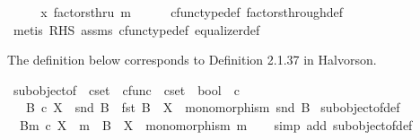 \begin{isabellebody}
\ \ \isamarkupfalse%
\ \isamarkupfalse%
\ {\isachardoublequoteopen}x\ factorsthru\ m{\isachardoublequoteclose}\isanewline
\ \ \ \ \isamarkupfalse%
\ cfunc{\isacharunderscore}{\kern0pt}type{\isacharunderscore}{\kern0pt}def\ factors{\isacharunderscore}{\kern0pt}through{\isacharunderscore}{\kern0pt}def\isanewline
\ \ \ \ \isamarkupfalse%
\ {\isacharparenleft}{\kern0pt}metis\ RHS\ assms{\isacharparenleft}{\kern0pt}{}{\isacharcomma}{\kern0pt}{}{\isacharcomma}{\kern0pt}{}{\isacharparenright}{\kern0pt}\ cfunc{\isacharunderscore}{\kern0pt}type{\isacharunderscore}{\kern0pt}def\ equalizer{\isacharunderscore}{\kern0pt}def{\isacharparenright}{\kern0pt}\isanewline
{}\isamarkupfalse%
%
\endisatagproof
{\isafoldproof}%
%
\isadelimproof
%
\endisadelimproof
%
\begin{isamarkuptext}%
The definition below corresponds to Definition 2.1.37 in Halvorson.%
\end{isamarkuptext}\isamarkuptrue%
\isamarkupfalse%
\ subobject{\isacharunderscore}{\kern0pt}of\ {\isacharcolon}{\kern0pt}{\isacharcolon}{\kern0pt}\ {\isachardoublequoteopen}cset\ {\isasymtimes}\ cfunc\ {\isasymRightarrow}\ cset\ {\isasymRightarrow}\ bool{\isachardoublequoteclose}\ {\isacharparenleft}{\kern0pt}\ {\isachardoublequoteopen}{\isasymsubseteq}\isactrlsub c{\isachardoublequoteclose}\ {}{}{\isacharparenright}{\kern0pt}\isanewline
\ \ \ {\isachardoublequoteopen}B\ {\isasymsubseteq}\isactrlsub c\ X\ {\isasymlongleftrightarrow}\ {\isacharparenleft}{\kern0pt}snd\ B\ {\isacharcolon}{\kern0pt}\ fst\ B\ {\isasymrightarrow}\ X\ {\isasymand}\ monomorphism\ {\isacharparenleft}{\kern0pt}snd\ B{\isacharparenright}{\kern0pt}{\isacharparenright}{\kern0pt}{\isachardoublequoteclose}\isanewline
\isanewline
{}\isamarkupfalse%
\ subobject{\isacharunderscore}{\kern0pt}of{\isacharunderscore}{\kern0pt}def{}{\isacharcolon}{\kern0pt}\isanewline
\ \ {\isachardoublequoteopen}{\isacharparenleft}{\kern0pt}B{\isacharcomma}{\kern0pt}m{\isacharparenright}{\kern0pt}\ {\isasymsubseteq}\isactrlsub c\ X\ {\isacharequal}{\kern0pt}\ {\isacharparenleft}{\kern0pt}m\ {\isacharcolon}{\kern0pt}\ B\ {\isasymrightarrow}\ X\ {\isasymand}\ monomorphism\ m{\isacharparenright}{\kern0pt}{\isachardoublequoteclose}\isanewline
%
\isadelimproof
\ \ %
\endisadelimproof
%
\isatagproof
{}\isamarkupfalse%
\ {\isacharparenleft}{\kern0pt}simp\ add{\isacharcolon}{\kern0pt}\ subobject{\isacharunderscore}{\kern0pt}of{\isacharunderscore}{\kern0pt}def{\isacharparenright}{\kern0pt}%

\end{isabellebody}
